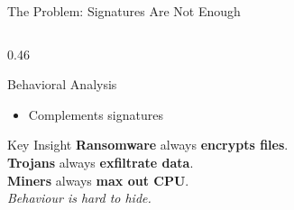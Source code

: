 \documentclass[aspectratio=169,12pt]{beamer}
\newcommand{\R}[1]{\textcolor{accent-r}{\textbf{#1}}}
\newcommand{\T}[1]{\textcolor{accent-t}{\textbf{#1}}}
\newcommand{\C}[1]{\textcolor{accent-c}{\textbf{#1}}}
\begin{document}
\begin{frame}{The Problem: Signatures Are Not Enough}
\begin{columns}[T]
\begin{column}{0.46\textwidth}
\begin{exampleblock}{Behavioral Analysis}
\begin{itemize}
          \item Complements signatures
        \end{itemize}
      \end{exampleblock}
      \vspace{0.4em}
      \begin{block}{Key Insight}
        \small
        \R{Ransomware} always \textbf{encrypts files}.\\
        \T{Trojans} always \textbf{exfiltrate data}.\\
        \C{Miners} always \textbf{max out CPU}.\\[0.2em]
        \textit{Behaviour is hard to hide.}
      \end{block}
    \end{column}
  \end{columns}
\end{frame}
\end{document}

